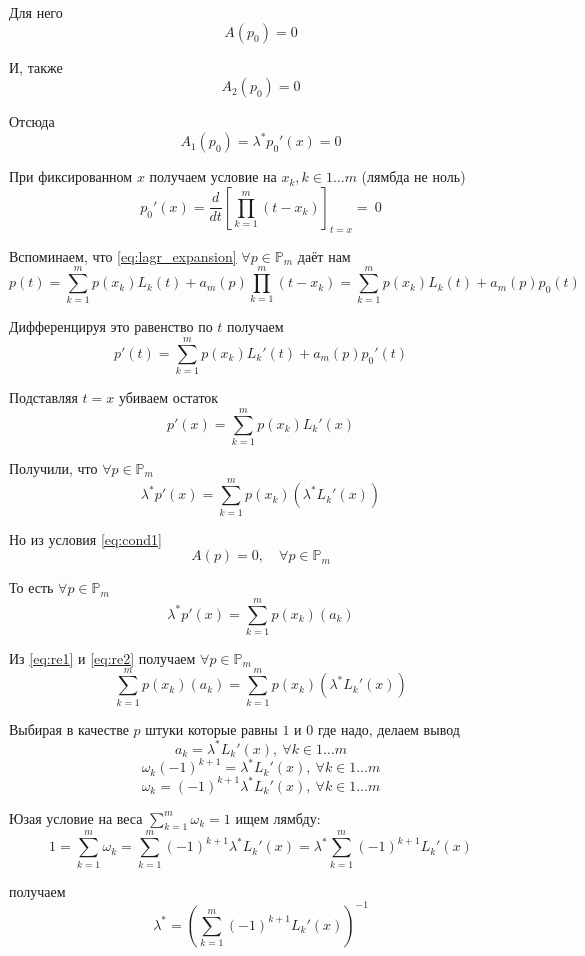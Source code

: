 \documentclass[12pt,a4paper]{article}
\begin{document}
	\noindent Для него
	\[A(p_0) = 0\]
	
	\noindent И, также 
	\[A_2(p_0) = 0\]
	
	\noindent Отсюда 
	\[A_1(p_0) = \lambda^* p_0'(x) =  0\]
	
	\noindent При фиксированном $x$ получаем условие на $x_k, k \in 1 \ldots m$ (лямбда не ноль)
	\[
	p_0'(x) = \frac{d}{dt} \left[\prod_{k=1}^{m} (t - x_k) \right]_{t=x} = \ 0
	\]
	
	\noindent Вспоминаем, что \eqref{eq:lagr_expansion}  $\forall p \in \mathbb{P}_m$ даёт нам
	\[
	p(t) = 
	\sum_{k=1}^{m} p(x_k) L_k(t) + 
	a_m(p) \prod_{k=1}^{m} (t-x_k) = 
	\sum_{k=1}^{m} p(x_k) L_k(t) + 
	a_m(p) p_0(t)
	\]
	
	\noindent Дифференцируя это равенство по $t$ получаем 
	\[
	p'(t) = 
	\sum_{k=1}^{m} p(x_k) L_k'(t) + 
	a_m(p) p_0'(t)
	\]
	
	\noindent Подставляя $t=x$ убиваем остаток
	\[
	p'(x) = 
	\sum_{k=1}^{m} p(x_k) L_k'(x)
	\]
	
	\noindent Получили, что $\forall p \in \mathbb{P}_m$
	\begin{equation}
		\lambda^* p'(x) = 
		\sum_{k=1}^{m} p(x_k) ( \lambda^* L_k'(x) ) 
		\label{eq:re1}
	\end{equation}
	
	\noindent Но из условия \eqref{eq:cond1} 
	\[
	A(p) = 0, \quad \forall p \in \mathbb{P}_m
	\]
	
	\noindent То есть $\forall p \in \mathbb{P}_m$
	\begin{equation}
		\lambda^* p'(x) = 
		\sum_{k=1}^{m} p(x_k) ( a_k ) 
		\label{eq:re2}
	\end{equation}
	
	\noindent Из \eqref{eq:re1} и \eqref{eq:re2} получаем $\forall p \in \mathbb{P}_m$
	\[
	\sum_{k=1}^{m} p(x_k) ( a_k ) = \sum_{k=1}^{m} p(x_k) ( \lambda^* L_k'(x) ) 
	\] 
	
	\noindent Выбирая в качестве $p$ штуки которые равны $1$ и $0$ где надо, делаем вывод
	\[
	a_k = \lambda^* L_k'(x), \ \forall k \in 1 \ldots m 
	\]
	\[
	\omega_k (-1)^{k+1} = \lambda^* L_k'(x), \ \forall k \in 1 \ldots m 
	\]
	\[
	\omega_k  = (-1)^{k+1} \lambda^* L_k'(x), \ \forall k \in 1 \ldots m 
	\]
	
	
	\noindent Юзая условие на веса $\sum_{k=1}^{m} \omega_k = 1$ ищем лямбду:
	\[
	1 = \sum_{k=1}^{m} \omega_k = \sum_{k=1}^{m} (-1)^{k+1} \lambda^* L_k'(x) = \lambda^* \sum_{k=1}^{m} (-1)^{k+1}  L_k'(x)
	\]
	
	\noindent получаем
	\[
	\lambda^* = \left( \sum_{k=1}^{m} (-1)^{k+1}  L_k'(x) \right) ^ {-1}
	\]
	
\end{document}
